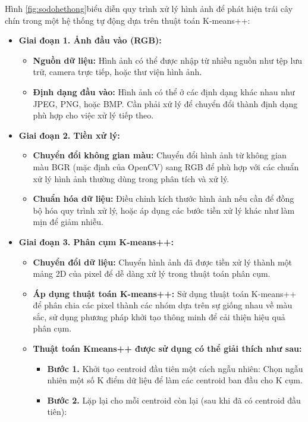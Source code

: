 \documentclass[a4paper]{article}
\begin{document}
Hình \ref{fig:sodohethong}biểu diễn quy trình xử lý hình ảnh để phát hiện trái cây chín trong một hệ thống tự động dựa trên thuật toán K-means++:
\begin{itemize}[label={}]
    \item \textbf{Giai đoạn 1. Ảnh đầu vào (RGB):} 
    \begin{itemize}[label={}]
        \item \textbf{Nguồn dữ liệu:} Hình ảnh có thể được nhập từ nhiều nguồn như tệp lưu trữ, camera trực tiếp, hoặc thư viện hình ảnh. 
        \item  \textbf{Định dạng đầu vào:} Hình ảnh có thể ở các định dạng khác nhau như JPEG, PNG, hoặc BMP. Cần phải xử lý để chuyển đổi thành định dạng phù hợp cho việc xử lý tiếp theo.
    \end{itemize}
    \item \textbf{Giai đoạn 2. Tiền xử lý: }
    \begin{itemize}[label={}]
        \item \textbf{Chuyển đổi không gian màu:} Chuyển đổi hình ảnh từ không gian màu BGR (mặc định của OpenCV) sang RGB để phù hợp với các chuẩn xử lý hình ảnh thường dùng trong phân tích và xử lý.
        \item \textbf{Chuẩn hóa dữ liệu:} Điều chỉnh kích thước hình ảnh nếu cần để đồng bộ hóa quy trình xử lý, hoặc áp dụng các bước tiền xử lý khác như làm mịn để giảm nhiễu.
    \end{itemize}
    \item  \textbf{Giai đoạn 3. Phân cụm K-means++: }
    \begin{itemize}[label={}]
        \item \textbf{Chuyển đổi dữ liệu:} Chuyển hình ảnh đã được tiền xử lý thành một mảng 2D của pixel để dễ dàng xử lý trong thuật toán phân cụm.
        \item \textbf{Áp dụng thuật toán K-means++:} Sử dụng thuật toán K-means++ để phân chia các pixel thành các nhóm dựa trên sự giống nhau về màu sắc, sử dụng phương pháp khởi tạo thông minh để cải thiện hiệu quả phân cụm.
        \item \textbf{Thuật toán Kmeans++ được sử dụng có thể giải thích như sau: }
        \begin{itemize}[label={}]
            \item \textbf{Bước 1. }Khởi tạo centroid đầu tiên một cách ngẫu nhiên: Chọn ngẫu nhiên một số K điểm dữ liệu để làm các centroid ban đầu cho K cụm.
            \item \textbf{Bước 2. }Lặp lại cho mỗi centroid còn lại (sau khi đã có centroid đầu tiên):

\end{itemize}
\end{itemize}
\end{itemize}
\end{document}
